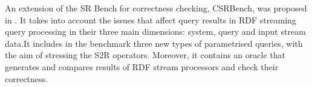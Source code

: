 An extension of the SR Bench for correctness checking, CSRBench, was proposed in \cite{DBLP:conf/semweb/DellAglioCBCV13}. It takes into account the issues that affect query results in RDF streaming query processing in their three main dimensions: system, query and input stream data.It includes in the benchmark three new types of parametrised queries, with the aim of stressing the S2R operators. Moreover, it contains an oracle that generates and compares results of RDF stream processors and check their correctness.